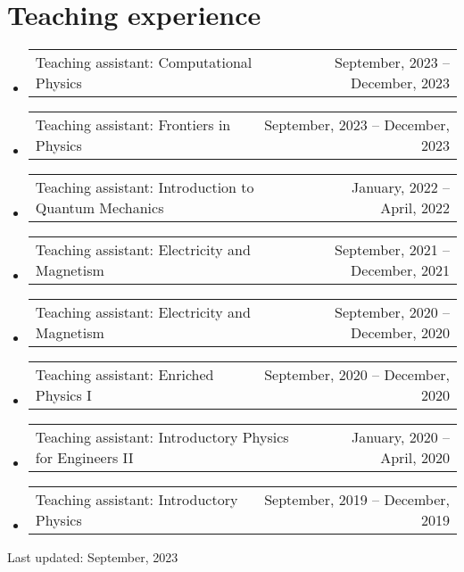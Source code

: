 \documentclass[letterpaper,11pt]{article}
\makeatletter
\newcommand{\TeachingItem}[2]{
	\item{\vspace{-1pt}
		\begin{tabular*}{0.92\textwidth}{l@{\extracolsep{\fill}}r}
			{#1} & {#2}
		\end{tabular*}
		\vspace{-5pt}
	}
}
\makeatother
\begin{document}
\section*{Teaching experience}
\begin{itemize}[leftmargin=*]
	\TeachingItem{Teaching assistant: Computational Physics}{September, 2023 -- December, 2023}
	\TeachingItem{Teaching assistant: Frontiers in Physics}{September, 2023 -- December, 2023}
	\TeachingItem{Teaching assistant: Introduction to Quantum Mechanics}{January, 2022 -- April, 2022}
	\TeachingItem{Teaching assistant: Electricity and Magnetism}{September, 2021 -- December, 2021}
	\TeachingItem{Teaching assistant: Electricity and Magnetism}{September, 2020 -- December, 2020}
	\TeachingItem{Teaching assistant: Enriched Physics I}{September, 2020 -- December, 2020}
	\TeachingItem{Teaching assistant: Introductory Physics for Engineers II}{January, 2020 -- April, 2020}
	\TeachingItem{Teaching assistant: Introductory Physics}{September, 2019 -- December, 2019}
\end{itemize}

\vspace{1cm}

\begin{flushright}
	Last updated: September, 2023
\end{flushright}
\end{document}
